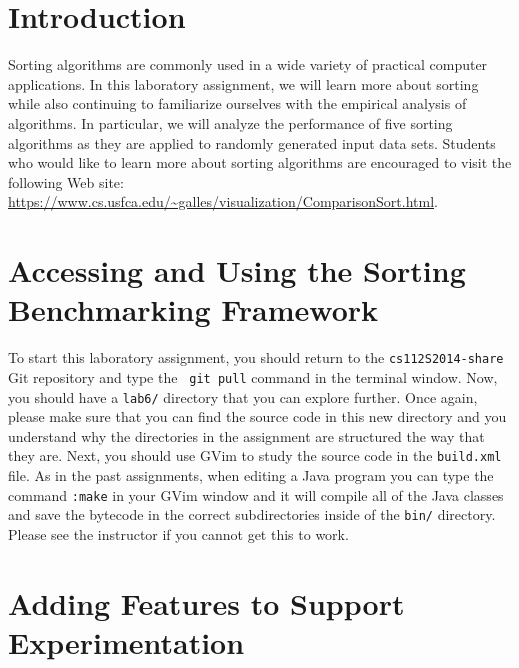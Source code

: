 


\usepackage[compact]{titlesec}


\section*{Introduction}

Sorting algorithms are commonly used in a wide variety of practical computer applications.  In this laboratory
assignment, we will learn more about sorting while also continuing to familiarize ourselves with the empirical analysis
of algorithms.  In particular, we will analyze the performance of five sorting algorithms as they are applied to
randomly generated input data sets.  Students who would like to learn more about sorting algorithms are encouraged to
visit the following Web site: \url{https://www.cs.usfca.edu/~galles/visualization/ComparisonSort.html}.

\section*{Accessing and Using the Sorting Benchmarking Framework}

To start this laboratory assignment, you should return to the {\tt cs112S2014-share} Git repository and type the {\tt
git pull} command in the terminal window.  Now, you should have a {\tt lab6/} directory that you can explore further.
Once again, please make sure that you can find the source code in this new directory and you understand why the
directories in the assignment are structured the way that they are. Next, you should use GVim to study the source code in
the {\tt build.xml} file.  As in the past assignments, when editing a Java program you can type the command {\tt :make}
in your GVim window and it will compile all of the Java classes and save the bytecode in the correct subdirectories
inside of the {\tt bin/} directory.  Please see the instructor if you cannot get this to work.

\section*{Adding Features to Support Experimentation}

